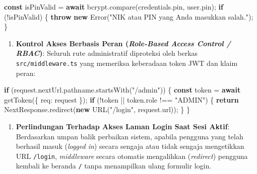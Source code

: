 \documentclass[
  indonesian,
  12pt,
]{report}
\newenvironment{Shaded}{}{}
\newcommand{\AttributeTok}[1]{\textcolor[rgb]{0.49,0.56,0.16}{#1}}
\newcommand{\BuiltInTok}[1]{\textcolor[rgb]{0.00,0.50,0.00}{#1}}
\newcommand{\ControlFlowTok}[1]{\textcolor[rgb]{0.00,0.44,0.13}{\textbf{#1}}}
\newcommand{\FunctionTok}[1]{\textcolor[rgb]{0.02,0.16,0.49}{#1}}
\newcommand{\KeywordTok}[1]{\textcolor[rgb]{0.00,0.44,0.13}{\textbf{#1}}}
\newcommand{\NormalTok}[1]{#1}
\newcommand{\OperatorTok}[1]{\textcolor[rgb]{0.40,0.40,0.40}{#1}}
\newcommand{\StringTok}[1]{\textcolor[rgb]{0.25,0.44,0.63}{#1}}
\providecommand{\tightlist}{%
  \setlength{\itemsep}{0pt}\setlength{\parskip}{0pt}}
\begin{document}
\begin{Shaded}
\begin{Highlighting}[]
\KeywordTok{const}\NormalTok{ isPinValid }\OperatorTok{=} \ControlFlowTok{await}\NormalTok{ bcrypt}\OperatorTok{.}\FunctionTok{compare}\NormalTok{(credentials}\OperatorTok{.}\AttributeTok{pin}\OperatorTok{,}\NormalTok{ user}\OperatorTok{.}\AttributeTok{pin}\NormalTok{)}\OperatorTok{;}
\ControlFlowTok{if}\NormalTok{ (}\OperatorTok{!}\NormalTok{isPinValid) \{}
  \ControlFlowTok{throw} \KeywordTok{new} \BuiltInTok{Error}\NormalTok{(}\StringTok{"NIK atau PIN yang Anda masukkan salah."}\NormalTok{)}\OperatorTok{;}
\NormalTok{\}}
\end{Highlighting}
\end{Shaded}

\begin{enumerate}
\def\labelenumi{\arabic{enumi}.}
\setcounter{enumi}{2}
\tightlist
\item
  \textbf{Kontrol Akses Berbasis Peran (\emph{Role-Based Access Control
  / RBAC})}: Seluruh rute administratif diproteksi oleh berkas
  \texttt{src/middleware.ts} yang memeriksa keberadaan token JWT dan
  klaim peran:
\end{enumerate}

\begin{Shaded}
\begin{Highlighting}[]
\ControlFlowTok{if}\NormalTok{ (request}\OperatorTok{.}\AttributeTok{nextUrl}\OperatorTok{.}\AttributeTok{pathname}\OperatorTok{.}\FunctionTok{startsWith}\NormalTok{(}\StringTok{"/admin"}\NormalTok{)) \{}
  \KeywordTok{const}\NormalTok{ token }\OperatorTok{=} \ControlFlowTok{await} \FunctionTok{getToken}\NormalTok{(\{ req}\OperatorTok{:}\NormalTok{ request \})}\OperatorTok{;}
  \ControlFlowTok{if}\NormalTok{ (}\OperatorTok{!}\NormalTok{token }\OperatorTok{||}\NormalTok{ token}\OperatorTok{.}\AttributeTok{role} \OperatorTok{!==} \StringTok{"ADMIN"}\NormalTok{) \{}
    \ControlFlowTok{return}\NormalTok{ NextResponse}\OperatorTok{.}\FunctionTok{redirect}\NormalTok{(}\KeywordTok{new} \FunctionTok{URL}\NormalTok{(}\StringTok{"/login"}\OperatorTok{,}\NormalTok{ request}\OperatorTok{.}\AttributeTok{url}\NormalTok{))}\OperatorTok{;}
\NormalTok{  \}}
\NormalTok{\}}
\end{Highlighting}
\end{Shaded}

\begin{enumerate}
\def\labelenumi{\arabic{enumi}.}
\setcounter{enumi}{3}
\tightlist
\item
  \textbf{Perlindungan Terhadap Akses Laman Login Saat Sesi Aktif}:
  Berdasarkan umpan balik perbaikan sistem, apabila pengguna yang telah
  berhasil masuk (\emph{logged in}) secara sengaja atau tidak sengaja
  mengetikkan URL \texttt{/login}, \emph{middleware} secara otomatis
  mengalihkan (\emph{redirect}) pengguna kembali ke beranda \texttt{/}
  tanpa menampilkan ulang formulir login.
\end{enumerate}
\end{document}
